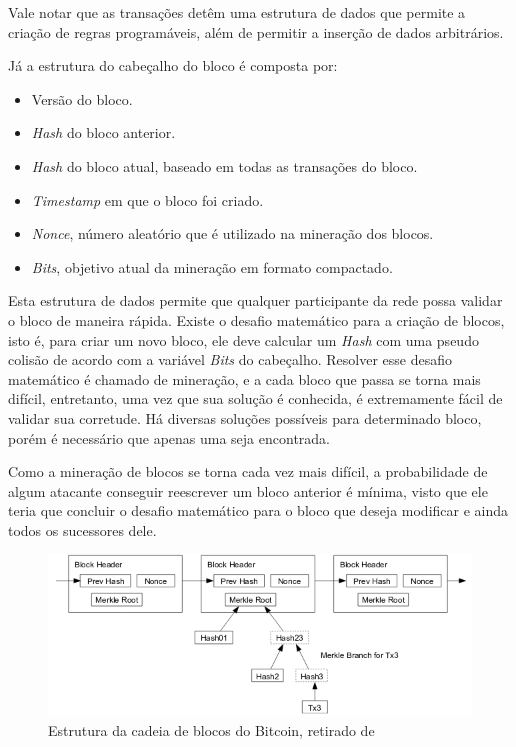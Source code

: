 \documentclass{ufsctex/ufsctex}
\begin{document}
Vale notar que as transações detêm uma estrutura de dados que permite a criação
de regras programáveis, além de permitir a inserção de dados arbitrários.

Já a estrutura do cabeçalho do bloco é composta por:
\begin{itemize}
	\item Versão do bloco.
	\item \textit{Hash} do bloco anterior.
	\item \textit{Hash} do bloco atual, baseado em todas as transações do bloco.
	\item \textit{Timestamp} em que o bloco foi criado.
	\item \textit{Nonce}, número aleatório que é utilizado na mineração dos blocos.
	\item \textit{Bits}, objetivo atual da mineração em formato compactado.
\end{itemize}

Esta estrutura de dados permite que qualquer participante da rede possa validar
o bloco de maneira rápida. Existe o desafio matemático para a criação de blocos,
isto é, para criar um novo bloco, ele deve calcular um \textit{Hash} com uma
pseudo colisão de acordo com a variável \textit{Bits} do cabeçalho. Resolver
esse desafio matemático é chamado de mineração, e a cada bloco que passa se
torna mais difícil, entretanto, uma vez que sua solução é conhecida, é
extremamente fácil de validar sua corretude. Há diversas soluções possíveis para
determinado bloco, porém é necessário que apenas uma seja
encontrada. \cite{Antonopoulos}

Como a mineração de blocos se torna cada vez mais difícil, a probabilidade de
algum atacante conseguir reescrever um bloco anterior é mínima, visto que ele
teria que concluir o desafio matemático para o bloco que deseja modificar e
ainda todos os sucessores dele.

\begin{figure}[h]
	\centering
	\includegraphics[scale=0.4]{blockchain}
	\caption{Estrutura da cadeia de blocos do Bitcoin, retirado de \cite{nakamoto2012bitcoin}}
	\label{fig:blockchain}
\end{figure}
\end{document}
